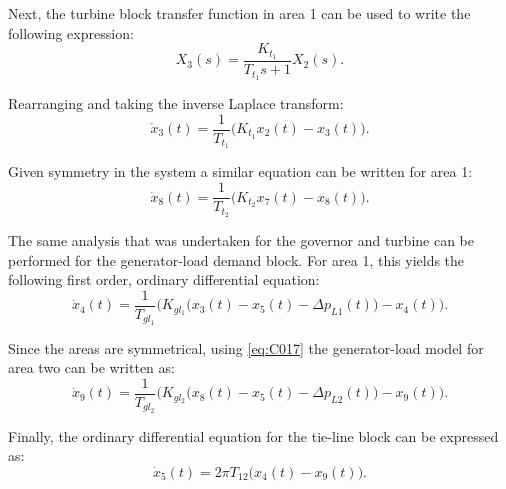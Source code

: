 Next, the turbine block transfer function in area 1 can be used to write the following expression:
\begin{equation}
	X_3(s) = \frac{K_{t_1}}{T_{t_1}s + 1} X_2(s). \label{eq:C014}
\end{equation}

Rearranging and taking the inverse Laplace transform:
\begin{equation}
	\dot{x}_3(t) = \frac{1}{T_{t_1}} \big( K_{t_1} x_2(t) - x_3(t) \big). \label{eq:C015}
\end{equation}

Given symmetry in the system a similar equation can be written for area 1:
\begin{equation}
	\dot{x}_8(t) = \frac{1}{T_{t_2}} \big( K_{t_2} x_7(t) - x_8(t) \big). \label{eq:C016}
\end{equation}

The same analysis that was undertaken for the governor and turbine can be performed for the generator-load demand block. For area 1, this yields the following first order, ordinary differential equation:
\begin{equation}
	\dot{x}_4(t) = \frac{1}{T_{gl_1}} \bigg( K_{gl_1} \big( x_3(t) - x_5(t) - \Delta p_{L1}(t) \big) - x_4(t) \bigg). \label{eq:C017}
\end{equation}

Since the areas are symmetrical, using \ref{eq:C017} the generator-load model for area two can be written as:
\begin{equation}
	\dot{x}_9(t) = \frac{1}{T_{gl_2}} \bigg( K_{gl_2} \big( x_8(t) - x_5(t) - \Delta p_{L2}(t) \big) - x_9(t) \bigg). \label{eq:C018}
\end{equation}

Finally, the ordinary differential equation for the tie-line block can be expressed as:
\begin{equation}
	\dot{x}_5(t) = 2 \pi T_{12} \big( x_4(t) - x_9(t) \big).
\end{equation}